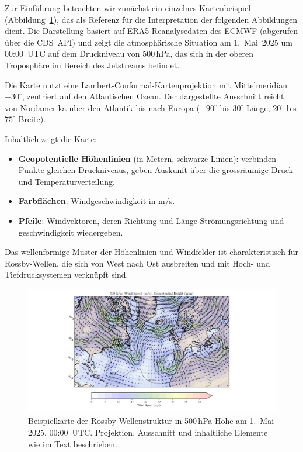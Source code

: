 Zur Einführung betrachten wir zunächst ein einzelnes Kartenbeispiel 
(Abbildung~\ref{fig:rossby_atlantic_single}), das als Referenz für die Interpretation der 
folgenden Abbildungen dient. 
Die Darstellung basiert auf ERA5-Reanalysedaten des ECMWF (abgerufen über die CDS~API) 
und zeigt die atmosphärische Situation am 1.\ Mai~2025 um 00:00~UTC auf dem Druckniveau 
von 500\,hPa, das sich in der oberen Troposphäre im Bereich des Jetstreams befindet.


Die Karte nutzt eine Lambert-Conformal-Kartenprojektion mit Mittelmeridian \(-30^\circ\), zentriert auf den Atlantischen Ozean.
Der dargestellte Ausschnitt reicht von Nordamerika über den Atlantik bis nach Europa (\(-90^\circ\) bis \(30^\circ\) Länge, \(20^\circ\) bis \(75^\circ\) Breite).

Inhaltlich zeigt die Karte:
\begin{itemize}
	\item \textbf{Geopotentielle Höhenlinien} (in Metern, schwarze Linien): verbinden Punkte gleichen Druckniveaus, geben Auskunft über die grossräumige Druck- und Temperaturverteilung.
	\item \textbf{Farbflächen}: Windgeschwindigkeit in m/s.
	\item \textbf{Pfeile}: Windvektoren, deren Richtung und Länge Strömungsrichtung und -geschwindigkeit wiedergeben.
\end{itemize}

Das wellenförmige Muster der Höhenlinien und Windfelder ist charakteristisch für Rossby-Wellen, die sich von West nach Ost ausbreiten und mit Hoch- und Tiefdrucksystemen verknüpft sind.

\begin{figure}
	\centering
	\includegraphics[width=\textwidth, trim=4cm 0cm 5cm 0cm, clip]{papers/rossby/images/weather/data_2025_5_1_00:00_500.pdf}
	\caption{Beispielkarte der Rossby-Wellenstruktur in 500\,hPa Höhe am 1.\ Mai 2025, 00:00~UTC.
		Projektion, Ausschnitt und inhaltliche Elemente wie im Text beschrieben.}
	\label{fig:rossby_atlantic_single}
\end{figure}

